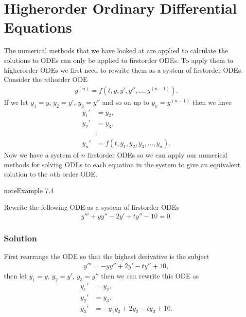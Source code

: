 \documentclass[letterpaper,10pt,english]{jupyterBook}
\begin{document}
\sphinxstepscope


\section{Higher\sphinxhyphen{}order Ordinary Differential Equations}
\label{\detokenize{1_IVPs/1.5_Higher_Order_ODEs:higher-order-ordinary-differential-equations}}\label{\detokenize{1_IVPs/1.5_Higher_Order_ODEs:higher-order-odes-section}}\label{\detokenize{1_IVPs/1.5_Higher_Order_ODEs::doc}}
\sphinxAtStartPar
The numerical methods that we have looked at are applied to calculate the solutions to ODEs can only be applied to first\sphinxhyphen{}order ODEs. To apply them to higher\sphinxhyphen{}order ODEs we first need to rewrite them as a system of first\sphinxhyphen{}order ODEs. Consider the \(n\)th\sphinxhyphen{}order ODE
\begin{equation*}
\begin{split} y^{(n)} = f(t, y, y', y'' ,\ldots ,y^{(n-1)}). \end{split}
\end{equation*}
\sphinxAtStartPar
If we let \(y_1=y\), \(y_2 =y'\), \(y_3 =y''\) and so on up to \(y_n =y^{(n-1)}\) then we have
\begin{align*}
    y_1' &= y_2,\\
    y_2' &= y_3,\\
    &\vdots \\
    y_n' &= f(t, y_1 , y_2 , y_3 , \ldots, y_n).
\end{align*}
\sphinxAtStartPar
Now we have a system of \(n\) first\sphinxhyphen{}order ODEs so we can apply our numerical methods for solving ODEs to each equation in the system to give an equivalent solution to the \(n\)th order ODE.

\begin{sphinxadmonition}{note}{Example 7.4}

\sphinxAtStartPar
Rewrite the following ODE as a system of first\sphinxhyphen{}order ODEs
\begin{align*}
    y''' + yy'' -2y' + ty'' - 10 = 0.
\end{align*}\subsubsection*{Solution}

\sphinxAtStartPar
First rearrange the ODE so that the highest derivative is the subject
\begin{align*}
    y''' = -yy'' + 2y' - ty'' + 10,
\end{align*}
\sphinxAtStartPar
then let \(y_1 = y\), \(y_2 = y'\), \(y_3 = y''\) then we can rewrite this ODE as
\begin{align*}
    y_1' &= y_2, \\
    y_2' &= y_3, \\
    y_3' &= - y_1 y_3 + 2y_2 - t y_3 + 10. 
\end{align*}\end{sphinxadmonition}
\end{document}
